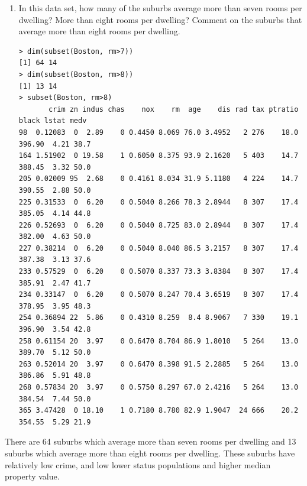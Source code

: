 \documentclass[11pt]{article}
\begin{document}
\begin{enumerate}
\begin{enumerate}
\item In this data set, how many of the suburbs average more than seven rooms per dwelling?  More than eight rooms per dwelling? Comment on the suburbs that average more than eight rooms per dwelling.
\begin{lstlisting}
> dim(subset(Boston, rm>7))
[1] 64 14
> dim(subset(Boston, rm>8))
[1] 13 14
> subset(Boston, rm>8)
       crim zn indus chas    nox    rm  age    dis rad tax ptratio  black lstat medv
98  0.12083  0  2.89    0 0.4450 8.069 76.0 3.4952   2 276    18.0 396.90  4.21 38.7
164 1.51902  0 19.58    1 0.6050 8.375 93.9 2.1620   5 403    14.7 388.45  3.32 50.0
205 0.02009 95  2.68    0 0.4161 8.034 31.9 5.1180   4 224    14.7 390.55  2.88 50.0
225 0.31533  0  6.20    0 0.5040 8.266 78.3 2.8944   8 307    17.4 385.05  4.14 44.8
226 0.52693  0  6.20    0 0.5040 8.725 83.0 2.8944   8 307    17.4 382.00  4.63 50.0
227 0.38214  0  6.20    0 0.5040 8.040 86.5 3.2157   8 307    17.4 387.38  3.13 37.6
233 0.57529  0  6.20    0 0.5070 8.337 73.3 3.8384   8 307    17.4 385.91  2.47 41.7
234 0.33147  0  6.20    0 0.5070 8.247 70.4 3.6519   8 307    17.4 378.95  3.95 48.3
254 0.36894 22  5.86    0 0.4310 8.259  8.4 8.9067   7 330    19.1 396.90  3.54 42.8
258 0.61154 20  3.97    0 0.6470 8.704 86.9 1.8010   5 264    13.0 389.70  5.12 50.0
263 0.52014 20  3.97    0 0.6470 8.398 91.5 2.2885   5 264    13.0 386.86  5.91 48.8
268 0.57834 20  3.97    0 0.5750 8.297 67.0 2.4216   5 264    13.0 384.54  7.44 50.0
365 3.47428  0 18.10    1 0.7180 8.780 82.9 1.9047  24 666    20.2 354.55  5.29 21.9
\end{lstlisting}
\end{enumerate}
There are 64 suburbs which average more than seven rooms per dwelling and 13 suburbs which average more than eight rooms per dwelling.  These suburbs have relatively low crime, and low lower status populations and higher median property value.











\end{enumerate}
\end{document}
